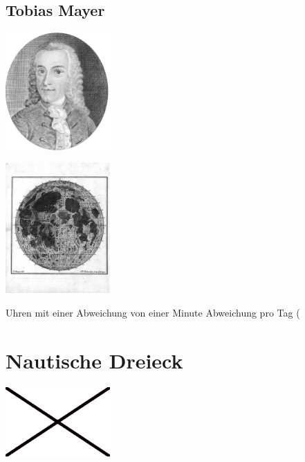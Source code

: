 \begin{refsection}
\subsection{Tobias Mayer}

\begin{center}
        \includegraphics[width=0.3\textwidth]{kugel/TobiasMayer.jpg}
\end{center}



\begin{center}
        \includegraphics[width=0.3\textwidth]{kugel/Mondkarte.jpg}
\end{center}


Uhren mit einer Abweichung von einer Minute Abweichung pro Tag (





\section{Nautische Dreieck}

\begin{center}
        \includegraphics[width=0.3\textwidth]{kugel/Beispielbild.jpg}
\end{center}


\end{refsection}
